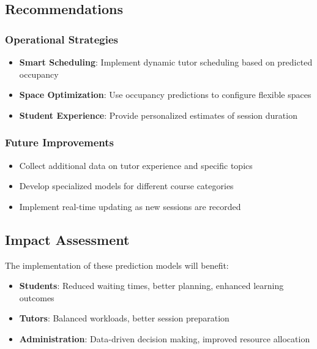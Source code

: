 \documentclass[12pt,letterpaper]{article}
\begin{document}
\subsection{Recommendations}

\subsubsection{Operational Strategies}

\begin{itemize}
    \item \textbf{Smart Scheduling}: Implement dynamic tutor scheduling based on predicted occupancy
    \item \textbf{Space Optimization}: Use occupancy predictions to configure flexible spaces
    \item \textbf{Student Experience}: Provide personalized estimates of session duration
\end{itemize}

\subsubsection{Future Improvements}

\begin{itemize}
    \item Collect additional data on tutor experience and specific topics
    \item Develop specialized models for different course categories
    \item Implement real-time updating as new sessions are recorded
\end{itemize}

\subsection{Impact Assessment}

The implementation of these prediction models will benefit:

\begin{itemize}
    \item \textbf{Students}: Reduced waiting times, better planning, enhanced learning outcomes
    \item \textbf{Tutors}: Balanced workloads, better session preparation
    \item \textbf{Administration}: Data-driven decision making, improved resource allocation
\end{itemize}
\end{document}
